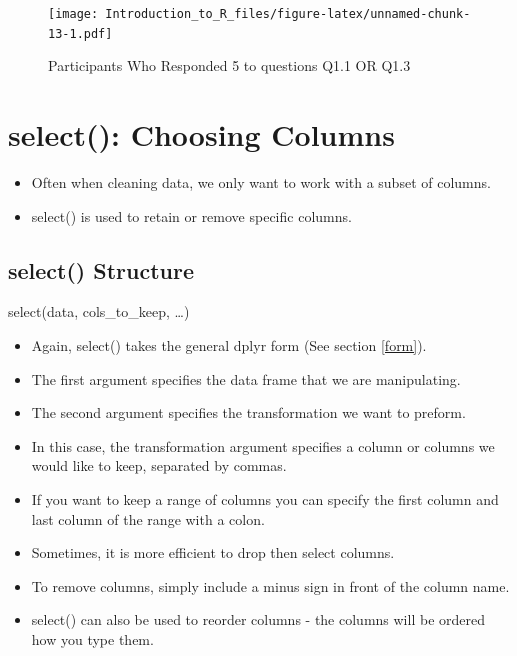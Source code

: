 \documentclass[]{book}
\providecommand{\tightlist}{%
  \setlength{\itemsep}{0pt}\setlength{\parskip}{0pt}}
\theoremstyle{definition}
\theoremstyle{definition}
\theoremstyle{definition}
\theoremstyle{remark}
\begin{document}
\begin{figure}
\centering
\texttt{[image: Introduction\_to\_R\_files/figure-latex/unnamed-chunk-13-1.pdf]}
\caption{\label{fig:unnamed-chunk-13}Participants Who Responded 5 to questions Q1.1 OR Q1.3}
\end{figure}

\hypertarget{select-choosing-columns}{%
\section{select(): Choosing Columns}\label{select-choosing-columns}}

\begin{itemize}
\tightlist
\item
  Often when cleaning data, we only want to work with a subset of columns.
\item
  select() is used to retain or remove specific columns.
\end{itemize}

\hypertarget{select-structure}{%
\subsection{select() Structure}\label{select-structure}}

select(data, cols\_to\_keep, \ldots{})

\begin{itemize}
\tightlist
\item
  Again, select() takes the general dplyr form (See section \ref{form}).
\item
  The first argument specifies the data frame that we are manipulating.
\item
  The second argument specifies the transformation we want to preform.
\item
  In this case, the transformation argument specifies a column or columns we would like to keep, separated by commas.
\item
  If you want to keep a range of columns you can specify the first column and last column of the range with a colon.
\item
  Sometimes, it is more efficient to drop then select columns.
\item
  To remove columns, simply include a minus sign in front of the column name.
\item
  select() can also be used to reorder columns - the columns will be ordered how you type them.
\end{itemize}
\end{document}
